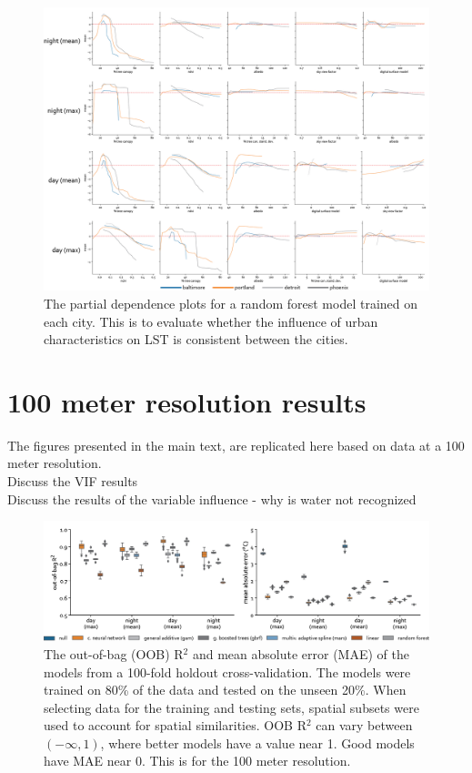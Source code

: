 \documentclass[final,3p,times,twocolumn,sort&compress]{elsarticle}
\begin{document}
\begin{figure}[h]
    \centering
    \includegraphics[width=\linewidth]{fig/report/pdp_cities_100.png}
    \caption[City specific partial dependence plots]{
    The partial dependence plots for a random forest model trained on each city.
    This is to evaluate whether the influence of urban characteristics on LST is consistent between the cities.
    }
    \label{fig:cities_100}
\end{figure}


\clearpage
\section{100 meter resolution results}
\label{ss:100_meter}
The figures presented in the main text, are replicated here based on data at a 100 meter resolution.
\\
\lbrack Discuss the VIF results  \rbrack\\
\lbrack Discuss the results of the variable influence - why is water not recognized  \rbrack


\begin{figure}[h]
    \centering
    \includegraphics[width=\linewidth]{fig/report/holdout_100.png}
    \caption[Holdout cross-validation results at 100 meter resolution]{
    The out-of-bag (OOB) R$^2$ and mean absolute error (MAE) of the models from a 100-fold holdout cross-validation. 
    The models were trained on 80\% of the data and tested on the unseen 20\%.
    When selecting data for the training and testing sets, spatial subsets were used to account for spatial similarities. 
    OOB R$^2$ can vary between $(-\infty, 1)$, where better models have a value near 1. 
    Good models have MAE near 0.
    This is for the 100 meter resolution.
    }
    \label{fig:holdout_100}
\end{figure}
\end{document}
